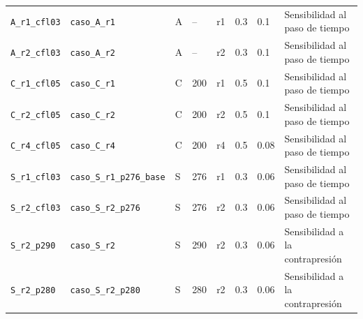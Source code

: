 \begin{longtable}{p{2.0cm}p{5.0cm}p{0.8cm}p{1.7cm}p{0.8cm}p{0.7cm}p{0.8cm}p{2.5cm}}
\scriptsize \texttt{A\_\allowbreak r1\_\allowbreak cfl03} & \scriptsize \texttt{caso\_\allowbreak A\_\allowbreak r1} & \scriptsize A & \scriptsize -- & \scriptsize r1 & \scriptsize 0.3 & \scriptsize 0.1 & \scriptsize Sensibilidad al paso de tiempo \\
\scriptsize \texttt{A\_\allowbreak r2\_\allowbreak cfl03} & \scriptsize \texttt{caso\_\allowbreak A\_\allowbreak r2} & \scriptsize A & \scriptsize -- & \scriptsize r2 & \scriptsize 0.3 & \scriptsize 0.1 & \scriptsize Sensibilidad al paso de tiempo \\
\scriptsize \texttt{C\_\allowbreak r1\_\allowbreak cfl05} & \scriptsize \texttt{caso\_\allowbreak C\_\allowbreak r1} & \scriptsize C & \scriptsize 200 & \scriptsize r1 & \scriptsize 0.5 & \scriptsize 0.1 & \scriptsize Sensibilidad al paso de tiempo \\
\scriptsize \texttt{C\_\allowbreak r2\_\allowbreak cfl05} & \scriptsize \texttt{caso\_\allowbreak C\_\allowbreak r2} & \scriptsize C & \scriptsize 200 & \scriptsize r2 & \scriptsize 0.5 & \scriptsize 0.1 & \scriptsize Sensibilidad al paso de tiempo \\
\scriptsize \texttt{C\_\allowbreak r4\_\allowbreak cfl05} & \scriptsize \texttt{caso\_\allowbreak C\_\allowbreak r4} & \scriptsize C & \scriptsize 200 & \scriptsize r4 & \scriptsize 0.5 & \scriptsize 0.08 & \scriptsize Sensibilidad al paso de tiempo \\
\scriptsize \texttt{S\_\allowbreak r1\_\allowbreak cfl03} & \scriptsize \texttt{caso\_\allowbreak S\_\allowbreak r1\_\allowbreak p276\_\allowbreak base} & \scriptsize S & \scriptsize 276 & \scriptsize r1 & \scriptsize 0.3 & \scriptsize 0.06 & \scriptsize Sensibilidad al paso de tiempo \\
\scriptsize \texttt{S\_\allowbreak r2\_\allowbreak cfl03} & \scriptsize \texttt{caso\_\allowbreak S\_\allowbreak r2\_\allowbreak p276} & \scriptsize S & \scriptsize 276 & \scriptsize r2 & \scriptsize 0.3 & \scriptsize 0.06 & \scriptsize Sensibilidad al paso de tiempo \\
\scriptsize \texttt{S\_\allowbreak r2\_\allowbreak p290} & \scriptsize \texttt{caso\_\allowbreak S\_\allowbreak r2} & \scriptsize S & \scriptsize 290 & \scriptsize r2 & \scriptsize 0.3 & \scriptsize 0.06 & \scriptsize Sensibilidad a la contrapresión \\
\scriptsize \texttt{S\_\allowbreak r2\_\allowbreak p280} & \scriptsize \texttt{caso\_\allowbreak S\_\allowbreak r2\_\allowbreak p280} & \scriptsize S & \scriptsize 280 & \scriptsize r2 & \scriptsize 0.3 & \scriptsize 0.06 & \scriptsize Sensibilidad a la contrapresión \\

\end{longtable}
